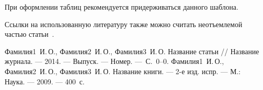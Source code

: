 \documentclass[a4paper]{article}
\begin{document}
При оформлении таблиц рекомендуется придерживаться данного
шаблона.

Ссылки на использованную литературу также можно считать
неотъемлемой частью статьи~\cite{StroevSP1,StroevSP2}.

\begin{thebibliography}{99}
 Фамилия1~{И.\,О.}, Фамилия2~{И.\,О.},
Фамилия3~{И.\,О.} Название статьи // Название журнала. --- 2014.
--- Выпуск. --- Номер. ---~С.~0--0.
 Фамилия1~{И.\,О.}, Фамилия2~{И.\,О.},
Фамилия3~{И.\,О.} Название книги. --- 2-е изд. испр. --- М.:
Наука.
--- 2009. --- 400~с.
\end{thebibliography}
\end{document}
